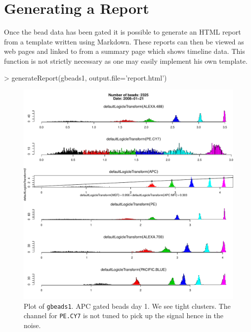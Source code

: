 \documentclass[11pt]{article}
\newcommand{\Robject}[1]{{\texttt{#1}}}
\begin{document}
\section{Generating a Report}

Once the bead data has been gated it is possible to generate an HTML report from a template written using Markdown.
These reports can then be viewed as web pages and linked to from a summary page which shows timeline data.
This function is not strictly necessary as one may easily implement his own template.

\begin{Schunk}
\begin{Sinput}
> generateReport(gbeads1, output.file='report.html')
\end{Sinput}
\end{Schunk}


%
\begin{figure}
  \centering
  \includegraphics{./gbeads1plot}
  \caption{
  \label{gbeads1plot}
  Plot of \Robject{gbeads1}.
  APC gated beads day 1. We see tight clusters.
  The channel for \texttt{PE.CY7} is not tuned to pick up the signal hence in the noise.
  }
\end{figure}
\end{document}
